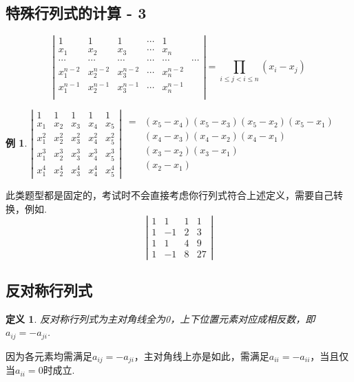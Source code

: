 \documentclass[12pt, a4paper, oneside]{ctexbook}
\newtheorem{definition}[theorem]{定义}
\newtheorem{example}[theorem]{例}
\begin{document}
\subsection{特殊行列式的计算 - 3}

$$\left | \begin{matrix}
    1 & 1 & 1 & \cdots & 1 \\
    x_1 & x_2 & x_3 & \cdots & x_n \\
    \cdots & \cdots & \cdots & \cdots & \cdots & \cdots \\
    x_1^{n-2} & x_2^{n-2} & x_3^{n-2} & \cdots & x_n^{n-2} \\
    x_1^{n-1} & x_2^{n-1} & x_3^{n-1} & \cdots & x_n^{n-1} \\
\end{matrix} \right | = \prod_{i \le j < i \le n}(x_i - x_j)$$

\begin{example}
    $\left | \begin{matrix}
        1 & 1 & 1 & 1 & 1 \\
        x_1 & x_2 & x_3 & x_4 & x_5 \\
        x_1^2 & x_2^2 & x_3^2 & x_4^2 & x_5^2 \\
        x_1^3 & x_2^3 & x_3^3 & x_4^3 & x_5^3 \\
        x_1^4 & x_2^4 & x_3^4 & x_4^4 & x_5^4
    \end{matrix} \right |$
    $\begin{aligned}
        =&(x_5-x_4)(x_5-x_3)(x_5-x_2)(x_5-x_1) \\
        & (x_4-x_3)(x_4-x_2)(x_4-x_1) \\
        & (x_3-x_2)(x_3-x_1) \\
        & (x_2-x_1)
    \end{aligned}$
\end{example}
此类题型都是固定的，考试时不会直接考虑你行列式符合上述定义，需要自己转换，例如. 
$$\left | \begin{matrix}
    1 & 1  & 1 & 1 \\
    1 & -1 & 2 & 3 \\
    1 & 1  & 4 & 9 \\
    1 & -1 & 8 & 27
\end{matrix} \right |$$

\subsection{反对称行列式}
\begin{definition}
    反对称行列式为主对角线全为0，上下位置元素对应成相反数，即$a_{ij} = -a_{ji}$. 
\end{definition}
因为各元素均需满足$a_{ij} = -a_{ji}$，主对角线上亦是如此，需满足$a_{ii} = -a_{ii}$，当且仅当$a_{ii} = 0$时成立. 
\end{document}
